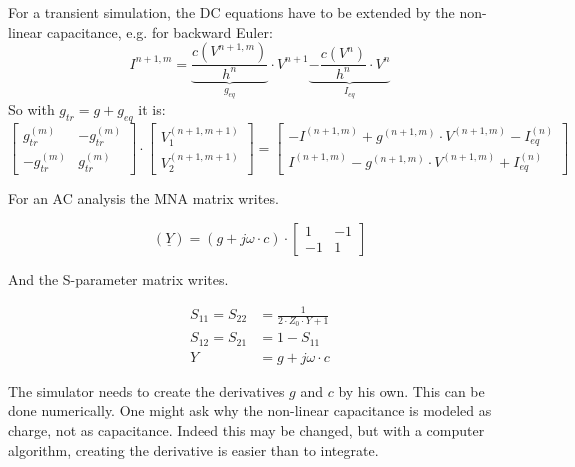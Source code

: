 For a transient simulation, the DC equations have to be extended
by the non-linear capacitance, e.g. for backward Euler:
\begin{equation}
I^{n+1,m} = \underbrace{\dfrac{c(V^{n+1,m})}{h^n}}_{g_{eq}}\cdot V^{n+1}
            \underbrace{- \dfrac{c(V^{n})}{h^n}\cdot V^{n}}_{I_{eq}}
\end{equation}
So with $g_{tr} = g + g_{eq}$ it is:
\begin{equation}
\begin{bmatrix}
 g_{tr}^{(m)} & -g_{tr}^{(m)}\\
-g_{tr}^{(m)} &  g_{tr}^{(m)}
\end{bmatrix}
\cdot
\begin{bmatrix}
V_{1}^{(n+1,m+1)}\\
V_{2}^{(n+1,m+1)}
\end{bmatrix}
=
\begin{bmatrix}
-I^{(n+1,m)} + g^{(n+1,m)}\cdot V^{(n+1,m)} - I_{eq}^{(n)}\\
 I^{(n+1,m)} - g^{(n+1,m)}\cdot V^{(n+1,m)} + I_{eq}^{(n)}
\end{bmatrix}
\end{equation}

For an AC analysis the MNA matrix writes.

\begin{equation}
(\underline{Y}) = (g + j\omega\cdot c)\cdot
\begin{bmatrix}
 1 & -1\\
-1 &  1
\end{bmatrix}
\end{equation}

And the S-parameter matrix writes.

\begin{align}
S_{11} = S_{22} &= \frac{1}{2\cdot Z_0\cdot Y + 1} \\
S_{12} = S_{21} &= 1-S_{11} \\
Y &= g + j\omega\cdot c
\end{align}

The simulator needs to create the derivatives $g$ and $c$ by his
own. This can be done numerically. One might ask why the non-linear
capacitance is modeled as charge, not as capacitance. Indeed this
may be changed, but with a computer algorithm, creating the
derivative  is easier than to integrate.

\addvspace{12pt}

